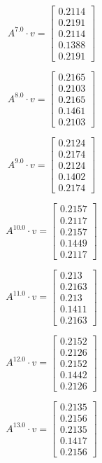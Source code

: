 \documentclass{article}
\begin{document}
      $$A^{7.0} \cdot v = \begin{bmatrix}
      0.2114\\
      0.2191\\
      0.2114\\
      0.1388\\
      0.2191
      \end{bmatrix}
      $$
      
      $$A^{8.0} \cdot v = \begin{bmatrix}
      0.2165\\
      0.2103\\
      0.2165\\
      0.1461\\
      0.2103
      \end{bmatrix}
      $$
      
      $$A^{9.0} \cdot v = \begin{bmatrix}
      0.2124\\
      0.2174\\
      0.2124\\
      0.1402\\
      0.2174
      \end{bmatrix}
      $$
      
      $$A^{10.0} \cdot v = \begin{bmatrix}
      0.2157\\
      0.2117\\
      0.2157\\
      0.1449\\
      0.2117
      \end{bmatrix}
      $$
      
      $$A^{11.0} \cdot v = \begin{bmatrix}
      0.213\\
      0.2163\\
      0.213\\
      0.1411\\
      0.2163
      \end{bmatrix}
      $$
      
      $$A^{12.0} \cdot v = \begin{bmatrix}
      0.2152\\
      0.2126\\
      0.2152\\
      0.1442\\
      0.2126
      \end{bmatrix}
      $$
      
      $$A^{13.0} \cdot v = \begin{bmatrix}
      0.2135\\
      0.2156\\
      0.2135\\
      0.1417\\
      0.2156
      \end{bmatrix}
      $$
      
\end{document}
